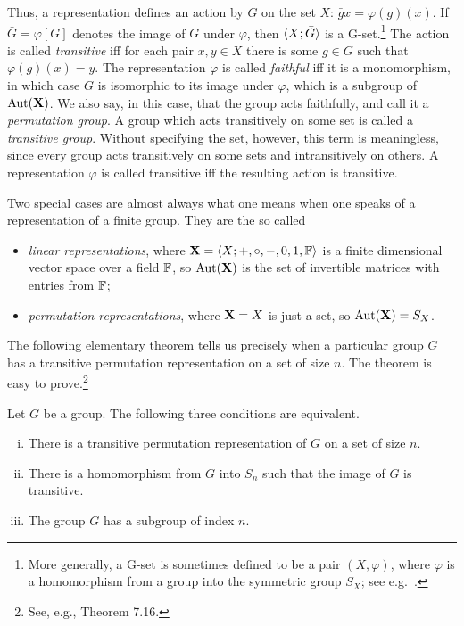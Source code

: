 Thus, a representation defines an action by $G$ on the set $X$: $\bar{g} x =
\varphi(g)(x)$.  If $\bar{G} = \varphi[G]$ denotes the image of $G$ under
$\varphi$, then $\langle X; \bar{G}\rangle$ is a G-set.\footnote{More generally, a G-set is
  sometimes defined to be a pair $(X, \varphi)$, where $\varphi$ is a homomorphism from
  a group into the symmetric group $S_X$; see e.g.~\cite{Suzuki:1982}.}  
The action is called
\emph{transitive} iff for each pair $x, y \in X$ there is some $g\in G$ such
that $\varphi(g)(x) = y$. The representation $\varphi$ is called \emph{faithful}
iff it is a monomorphism, in which case $G$ is isomorphic to its image under
$\varphi$, which is a subgroup of $\operatorname{Aut}(\mathbf{X})$.  We also say, in this case, that
the group acts faithfully, and call it a \emph{permutation group}.
A group which acts transitively on some set is called a \emph{transitive group}.
Without specifying the set, however, this term is meaningless, since
every group acts transitively on some sets and intransitively on others.  
A representation $\varphi$ is called transitive iff the resulting action is transitive.

Two special cases are almost always what one means when one speaks of a
representation of a finite group.  They are the so called
\begin{itemize}
\item \emph{linear representations}, where $\mathbf{X} = \langle X; +, \circ, -, 0, 1, \mathbb{F}\rangle$ is a finite dimensional vector
  space over a field $\mathbb{F}$, so $\operatorname{Aut}(\mathbf{X})$ is the set of invertible matrices with entries from $\mathbb{F}$;
\item \emph{permutation representations}, where $\mathbf{X} = X$ is just a set, so $\operatorname{Aut}(\mathbf{X}) = S_X$.
\end{itemize}

The following elementary theorem tells us precisely when a particular group $G$
has a transitive permutation representation on a set of size $n$.
The theorem is easy to prove.\footnote{See, e.g., \cite{Suzuki:1982} Theorem
  7.16.}
\begin{theorem}
  Let $G$ be a group.  The following three conditions are equivalent.
  \begin{enumerate}[(i)]
  \item There is a transitive permutation representation of $G$ on a set of size
    $n$.
  \item There is a homomorphism from $G$ into $S_n$ such that the image of $G$
    is transitive. 
  \item The group $G$ has a subgroup of index $n$.
  \end{enumerate}
\end{theorem}


